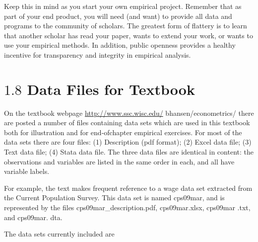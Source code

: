 \documentclass[10pt]{article}
\begin{document}
Keep this in mind as you start your own empirical project. Remember that as part of your end product, you will need (and want) to provide all data and programs to the community of scholars. The greatest form of flattery is to learn that another scholar has read your paper, wants to extend your work, or wants to use your empirical methods. In addition, public openness provides a healthy incentive for transparency and integrity in empirical analysis.

\section{$1.8$ Data Files for Textbook}
On the textbook webpage \href{http://www.ssc.wisc.edu/}{http://www.ssc.wisc.edu/} bhansen/econometrics/ there are posted a number of files containing data sets which are used in this textbook both for illustration and for end-ofchapter empirical exercises. For most of the data sets there are four files: (1) Description (pdf format); (2) Excel data file; (3) Text data file; (4) Stata data file. The three data files are identical in content: the observations and variables are listed in the same order in each, and all have variable labels.

For example, the text makes frequent reference to a wage data set extracted from the Current Population Survey. This data set is named cps09mar, and is represented by the files cps09mar\_description.pdf, cps09mar.xlsx, cps09mar .txt, and cps09mar. dta.

The data sets currently included are
\end{document}
